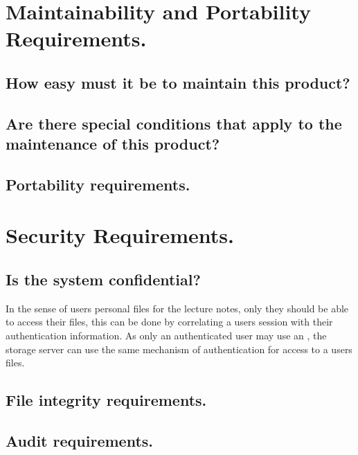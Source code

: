 \NA

\section{Maintainability and Portability Requirements.}

\subsection{How easy must it be to maintain this product?}

\NA

\subsection{Are there special conditions that apply to the maintenance of this product?}

\NA

\subsection{Portability requirements.}

\NA

\section{Security Requirements.}

\subsection{Is the system confidential?}

In the sense of users personal files for the lecture notes, only they should be able to access their files, this can be done by correlating a users session with their authentication information. As only an authenticated user may use an \iDesk, the storage server can use the same mechanism of authentication for access to a users files.

\subsection{File integrity requirements.}

\NA

\subsection{Audit requirements.}


